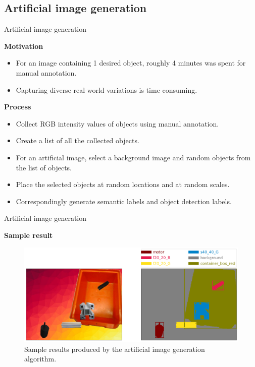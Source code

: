 \documentclass{beamer}
\begin{document}
\subsection{Artificial image generation}

\begin{frame}{Artificial image generation}

	\textbf{Motivation}
	\begin{small}
		\begin{itemize}
			\item For an image containing 1 desired object, roughly 4 minutes was spent for manual annotation.
			\item Capturing diverse real-world variations is time consuming.
		\end{itemize}
	\end{small}
		
	\vspace{5mm}
		
	\textbf{Process}
	\begin{small}
		\begin{itemize}
			\item Collect RGB intensity values of objects using manual annotation.
			\item Create a list of all the collected objects.
			\item For an artificial image, select a background image and random objects from the list of objects. 
			\item Place the selected objects at random locations and at random scales. 
			\item Correspondingly generate semantic labels and object detection labels.
		\end{itemize}
	\end{small}

\end{frame}

\begin{frame}{Artificial image generation}
	
	\textbf{Sample result}	
		
	\begin{figure}
		\centering
		\includegraphics[scale=0.26]{images/sample_result_1}
		\captionsetup{justification=centering,margin=0.2cm}
		\caption{Sample results produced by the artificial image generation algorithm.}
		\label{Fig:sample}
	\end{figure}
\end{frame}
\end{document}
